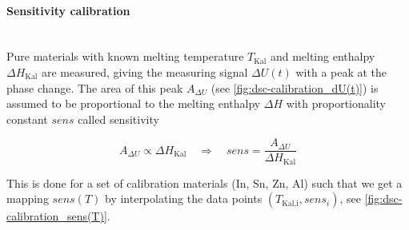 \documentclass{scrartcl}[12pt, halfparskip]
\numberwithin{equation}{section}
\numberwithin{figure}{section}
\numberwithin{table}{section}
\begin{document}
\paragraph{Sensitivity calibration}\mbox{}\\
Pure materials with known melting temperature $T_{\text{Kal}}$ and melting enthalpy $\Delta H_{\text{Kal}}$ are measured, giving the measuring signal $\Delta U(t)$ with a peak at the phase change. 
The area of this peak $A_{\Delta U}$ (see \cref{fig:dsc-calibration_dU(t)}) is assumed to be proportional to the melting enthalpy $\Delta H$ with proportionality constant $sens$ called sensitivity

\begin{equation}
	A_{\Delta U} \propto \Delta H_{\text{Kal}} \quad \Rightarrow \quad sens = \frac{A_{\Delta U}}{\Delta H_{\text{Kal}}}
\end{equation} 

This is done for a set of calibration materials (In, Sn, Zn, Al) such that we get a mapping $sens(T)$ by interpolating the data points $(T_{\text{Kal,i}}, sens_i)$, see \cref{fig:dsc-calibration_sens(T)}.
\end{document}
